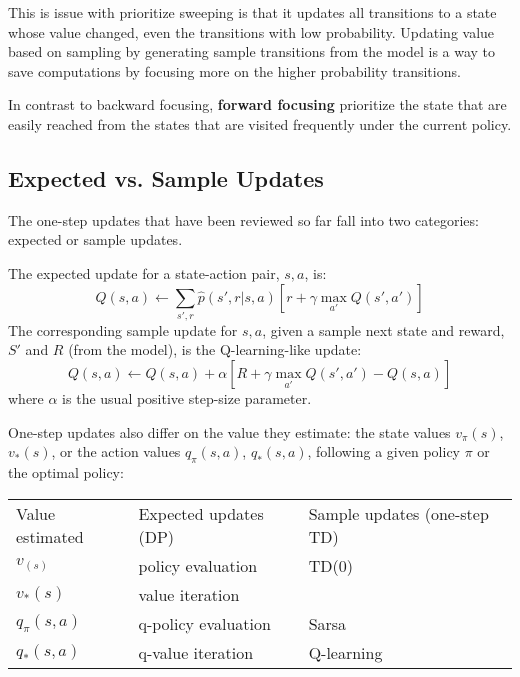 \documentclass[11pt]{article}
\begin{document}
This is issue with prioritize sweeping is that it updates all transitions to a
state whose value changed, even the transitions with low probability. Updating
value based on sampling by generating sample transitions from the model is a way
to save computations by focusing more on the higher probability transitions.

In contrast to backward focusing, \textbf{forward focusing} prioritize the state that
are easily reached from the states that are visited frequently under the current
policy.

\subsection{Expected vs. Sample Updates}
\label{sec:orga364074}

The one-step updates that have been reviewed so far fall into two categories:
expected or sample updates.

The expected update for a state-action pair, \(s,a\), is:
\begin{equation}
Q(s,a) \leftarrow \sum\limits_{s',r}\hat{p}(s',r|s,a)\left[r+\gamma \max_{a'}
Q(s',a')\right]
\end{equation}
The corresponding sample update for \(s,a\), given a sample next state and reward,
\(S'\) and \(R\) (from the model), is the Q-learning-like update:
\begin{equation}
Q(s,a) \leftarrow Q(s,a) + \alpha \left[R + \gamma \max_{a'} Q(s',a') -
Q(s,a)\right]
\end{equation}
where \(\alpha\) is the usual positive step-size parameter.

One-step updates also differ on the value they estimate: the state values
\(v_\pi(s)\), \(v_*(s)\), or the action values \(q_\pi(s,a)\), \(q_*(s,a)\), following a
given policy \(\pi\) or the optimal policy:

\begin{center}
\begin{tabular}{lll}
Value estimated & Expected updates (DP) & Sample updates (one-step TD)\\
\(v_(s)\) & policy evaluation & TD(0)\\
\(v_*(s)\) & value iteration & \\
\(q_\pi(s,a)\) & q-policy evaluation & Sarsa\\
\(q_*(s,a)\) & q-value iteration & Q-learning\\
\end{tabular}
\end{center}
\end{document}
